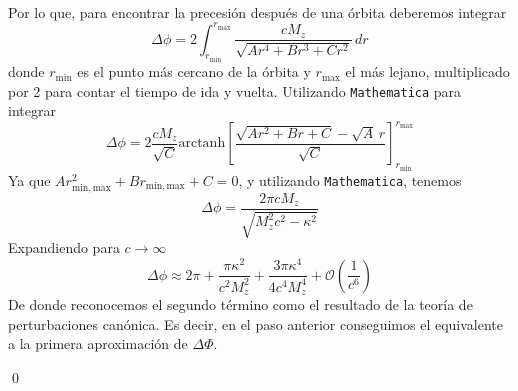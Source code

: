 \documentclass[]{article}
\numberwithin{equation}{section}
\begin{document}
\begin{enumerate}
\begin{align}
	\end{align}
	Por lo que, para encontrar la precesión después de una órbita deberemos integrar
	\begin{equation}
		\Delta\phi = 2 \int_{r_\mathrm{min}}^{r_\mathrm{max}} \frac{c M_z}{\sqrt{A r^4 + B r^3 + C r^2}} \, dr
	\end{equation}
	donde $r_\mathrm{min}$ es el punto más cercano de la órbita y $r_\mathrm{max}$ el más lejano, multiplicado por 2 para contar el tiempo de ida y vuelta. Utilizando \texttt{Mathematica} para integrar
	\begin{equation}
		\Delta\phi = 2 \frac{c M_z}{\sqrt{C}} \mathrm{arctanh}\! \left[\frac{\sqrt{A r^2 + B r + C} - \sqrt{A} \, r }{\sqrt{C}} \right]_{r_\mathrm{min} }^{r_\mathrm{max} }
	\end{equation}
	Ya que $A r_\mathrm{min,max}^2 + B r_\mathrm{min,max} + C = 0$, y utilizando \texttt{Mathematica}, tenemos
	\begin{equation}
		\Delta\phi = \frac{2 \pi c M_z}{\sqrt{M_z^2 c^2 - \kappa^2}}
	\end{equation}
	Expandiendo para $c \to \infty$
	\begin{equation}
		\Delta\phi \approx 2 \pi + \frac{\pi \kappa ^2}{c^2 M_z^2} + \frac{3 \pi  \kappa ^4}{4 c^4 M_z^4} + \mathcal{O}\left(\frac{1}{c^6}\right)
	\end{equation}
	De donde reconocemos el segundo término como el resultado de la teoría de perturbaciones canónica. Es decir, en el paso anterior conseguimos el equivalente a la primera aproximación de $\Delta\Phi$.
	
	\qed
\end{enumerate}
\end{document}
